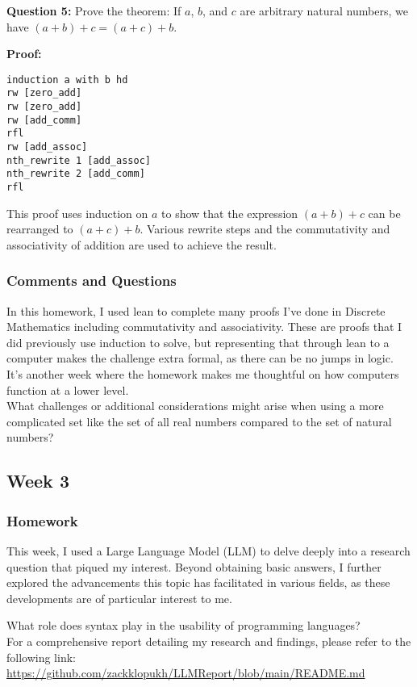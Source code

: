 \documentclass{article}
\theoremstyle{theorem}
\theoremstyle{definition}
\theoremstyle{remark}
\begin{document}
{\textbf{Question 5:} Prove the theorem: If \( a \), \( b \), and \( c \) are arbitrary natural numbers, we have \( (a + b) + c = (a + c) + b \).

\textbf{Proof:}
\begin{verbatim}
induction a with b hd
rw [zero_add]
rw [zero_add]
rw [add_comm]
rfl
rw [add_assoc]
nth_rewrite 1 [add_assoc]
nth_rewrite 2 [add_comm]
rfl
\end{verbatim}

This proof uses induction on \( a \) to show that the expression \( (a + b) + c \) can be rearranged to \( (a + c) + b \). Various rewrite steps and the commutativity and associativity of addition are used to achieve the result.


\subsubsection*{Comments and Questions}

In this homework, I used lean to complete many proofs I've done in Discrete Mathematics including commutativity and associativity. These are proofs that I did previously use induction to solve, but representing that through lean to a computer makes the challenge extra formal, as there can be no jumps in logic. It's another week where the homework makes me thoughtful on how computers function at a lower level. \\

What challenges or additional considerations might arise when using a more complicated set like the set of all real numbers compared to the set of natural numbers?

\subsection{Week 3}

\subsubsection*{Homework}


This week, I used a Large Language Model (LLM) to delve deeply into a research question that piqued my interest. Beyond obtaining basic answers, I further explored the advancements this topic has facilitated in various fields, as these developments are of particular interest to me.

What role does syntax play in the usability of programming languages? \\
For a comprehensive report detailing my research and findings, please refer to the following link: \\
\url{https://github.com/zackklopukh/LLMReport/blob/main/README.md}

}
\end{document}
